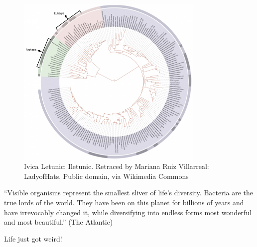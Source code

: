 \documentclass[
]{book}
\begin{document}
\begin{figure}
\centering
\includegraphics[width=0.8\textwidth,height=\textheight]{./Figures/TreeofLife06.png}
\caption{Ivica Letunic: Iletunic. Retraced by Mariana Ruiz Villarreal: LadyofHats, Public domain, via Wikimedia Commons}
\end{figure}

``Visible organisms represent the smallest sliver of life's diversity. Bacteria are the true lords of the world. They have been on this planet for billions of years and have irrevocably changed it, while diversifying into endless forms most wonderful and most beautiful.'' (The Atlantic)

Life just got weird!
\end{document}
